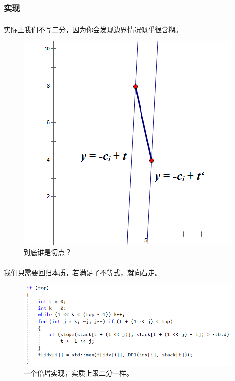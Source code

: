 \documentclass[9pt, UTF8]{beamer} %
\newcommand \ftss {\frametitle{\insertsubsubsection}}
\begin{document}
	\subsubsection{实现}

	\begin{frame}
		\ftss

		实际上我们不写二分，因为你会发现边界情况似乎很含糊。

		\begin{figure}
			\centering
			\includegraphics[scale=0.35]{pic/pic9.png}
			\caption{到底谁是切点？}
		\end{figure}
	\end{frame}

	\begin{frame}
		\ftss

		我们只需要回归本质，若满足了不等式，就向右走。

		\begin{figure}
			\centering
			\includegraphics[scale=0.4]{pic/pic10.png}
			\caption{一个倍增实现，实质上跟二分一样。}
		\end{figure}
	\end{frame}
\end{document}
